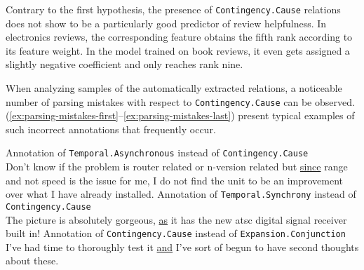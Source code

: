 \documentclass[
    a4paper,%
    12pt,%
    oneside,%
    toc=bibliography,
    final,
]{scrartcl}
\begin{document}
\begin{table}[h!]
	\centering
	
	\caption{Comparison of selected linguistic features between reviews including and reviews without \lstinline|Expansion.Conjunction| relations in book reviews}
	\label{tab:conjunction-features-books}
	
	\begin{threeparttable}
	\renewcommand{\arraystretch}{1.5}
	
	\end{threeparttable}

\end{table}

Contrary to the first hypothesis, the presence of \lstinline|Contingency.Cause| relations does not show to be a particularly good predictor of review helpfulness. In electronics reviews, the corresponding feature obtains the fifth rank according to its feature weight. In the model trained on book reviews, it even gets assigned a slightly negative coefficient and only reaches rank nine.

When analyzing samples of the automatically extracted relations, a noticeable number of parsing mistakes with respect to \lstinline|Contingency.Cause| can be observed. (\ref{ex:parsing-mistakes-first}–\ref{ex:parsing-mistakes-last}) present typical examples of such incorrect annotations that frequently occur.

\begin{exe}
\ex \label{ex:parsing-mistakes-first} Annotation of \lstinline|Temporal.Asynchronous| instead of \lstinline|Contingency.Cause|\\
Don't know if the problem is router related or n-version related but \underline{since} range and not speed is the issue for me, I do not find the unit to be an improvement over what I have already installed.
\ex Annotation of \lstinline|Temporal.Synchrony| instead of \lstinline|Contingency.Cause|\\
The picture is absolutely gorgeous, \underline{as} it has the new atsc digital signal receiver built in!
\ex \label{ex:parsing-mistakes-last} Annotation of \lstinline|Contingency.Cause| instead of \lstinline|Expansion.Conjunction|\\
I've had time to thoroughly test it \underline{and} I've sort of begun to have second thoughts about these.
\end{exe}
\end{document}

